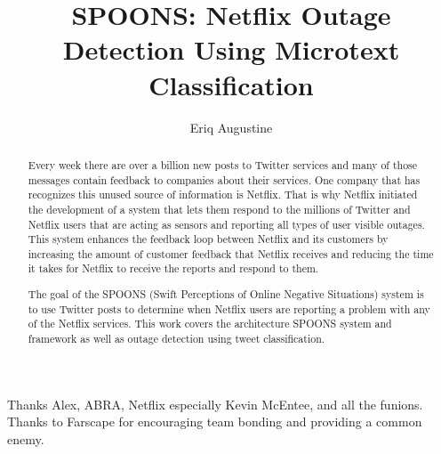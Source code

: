 \documentclass[12pt]{ucthesis}
\begin{document}

\title{SPOONS: Netflix Outage Detection Using Microtext Classification}
\author{Eriq Augustine}
  
 
      

\maketitle

\begin{frontmatter}

\copyrightpage

\committeemembershippage

\begin{abstract}

Every week there are over a billion new posts to Twitter services and many of
those messages contain feedback to companies about their services. One company
that has recognizes this unused source of information is Netflix. That is why
Netflix initiated the development of a system that lets them respond to the
millions of Twitter and Netflix users that are acting as sensors and reporting all types of user
visible outages. This system enhances the feedback loop between Netflix and
its customers by increasing the amount of customer feedback that Netflix receives
and reducing the time it takes for Netflix to receive the reports and respond to them.

The goal of the SPOONS (Swift Perceptions of Online Negative Situations) system
is to use Twitter posts to determine when Netflix users are reporting a problem
with any of the Netflix services. This work covers the architecture SPOONS system and framework
as well as outage detection using tweet classification.

\end{abstract}

\begin{acknowledgements}

Thanks Alex, ABRA, Netflix especially Kevin McEntee, and all the funions.
Thanks to Farscape for encouraging team bonding and providing a common enemy.

\end{acknowledgements}

\tableofcontents

\listoftables

\listoffigures

\end{frontmatter}
\end{document}
